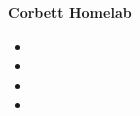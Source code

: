 \textbf{{Corbett Homelab} \hfill} \par
\begin{itemize}
	\item 
    \item 
    \item 
    \item 
\end{itemize}\vspace{0.1cm}\par